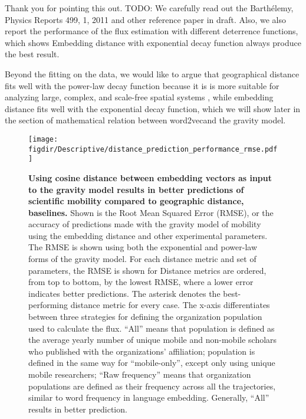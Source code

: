 \documentclass[12pt,a4paper]{article}
\def\figdir{../Figs}
\newcommand{\response}[1]{{\leavevmode\noindent #1}}
\begin{document}
\response{%
Thank you for pointing this out. 
TODO:
We carefully read out the Barthélemy, Physics Reports 499, 1, 2011 and other reference paper in draft.
Also, we also report the performance of the flux estimation with different deterrence functions, which shows Embedding distance with exponential decay function always produce the best result.


Beyond the ﬁtting on the data, we would like to argue that geographical distance ﬁts well with the power-law decay function because it is is more suitable for analyzing large, complex, and scale-free spatial systems , while embedding distance ﬁts well with the exponential decay function, which we will show later in the section of mathematical relation between word2vecand the gravity model.
}


\begin{figure}[p!]
	\centering
	\texttt{[image: \\figdir/Descriptive/distance\_prediction\_performance\_rmse.pdf]}
	\caption{
		\textbf{Using cosine distance between embedding vectors as input to the gravity model results in better predictions of scientific mobility compared to geographic distance, baselines.}
		Shown is the Root Mean Squared Error (RMSE), or the accuracy of predictions made with the gravity model of mobility using the embedding distance and other experimental parameters.
		The RMSE is shown using both the exponential and power-law forms of the gravity model. 
		For each distance metric and set of parameters, the RMSE is shown for 
		Distance metrics are ordered, from top to bottom, by the lowest RMSE, where a lower error indicates better predictions. 
		The asterisk denotes the best-performing distance metric for every case. 
		The x-axis differentiates between three strategies for defining the organization population used to calculate the flux. 
		``All'' means that population is defined as the average yearly number of unique mobile and non-mobile scholars who published with the organizations' affiliation;
		population is defined in the same way for ``mobile-only'', except only using unique mobile researchers;
		``Raw frequency'' means that organization populations are defined as their frequency across all the trajectories, similar to word frequency in language embedding. 
		Generally, ``All'' results in better prediction.
		}
	\label{fig:supp:distancermse}
\end{figure}
\end{document}
